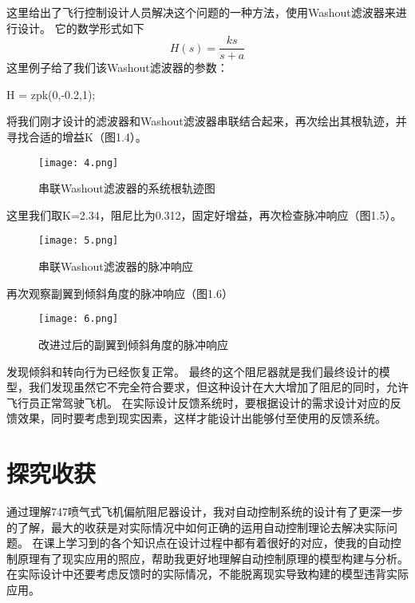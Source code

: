 \documentclass[AutoFakeBold]{LZUThesis}
\begin{document}
这里给出了飞行控制设计人员解决这个问题的一种方法，使用Washout滤波器来进行设计。
它的数学形式如下
\begin{equation}
H(s)=\frac{ks}{s+a}
\end{equation}
这里例子给了我们该Washout滤波器的参数：

    H = zpk(0,-0.2,1);

将我们刚才设计的滤波器和Washout滤波器串联结合起来，再次绘出其根轨迹，并寻找合适的增益K（图1.4）。

\begin{figure}[htbp]
    \centering
    \texttt{[image: 4.png]}
    \caption{串联Washout滤波器的系统根轨迹图}
\end{figure}

这里我们取K=2.34，阻尼比为0.312，固定好增益，再次检查脉冲响应（图1.5）。

\begin{figure}[htbp]
    \centering
    \texttt{[image: 5.png]}
    \caption{串联Washout滤波器的脉冲响应}
\end{figure}

再次观察副翼到倾斜角度的脉冲响应（图1.6）

\begin{figure}[htbp]
    \centering
    \texttt{[image: 6.png]}
    \caption{改进过后的副翼到倾斜角度的脉冲响应}
\end{figure}

发现倾斜和转向行为已经恢复正常。
最终的这个阻尼器就是我们最终设计的模型，我们发现虽然它不完全符合要求，但这种设计在大大增加了阻尼的同时，允许飞行员正常驾驶飞机。
在实际设计反馈系统时，要根据设计的需求设计对应的反馈效果，同时要考虑到现实因素，这样才能设计出能够付至使用的反馈系统。


\chapter{探究收获}
通过理解747喷气式飞机偏航阻尼器设计，我对自动控制系统的设计有了更深一步的了解，最大的收获是对实际情况中如何正确的运用自动控制理论去解决实际问题。
在课上学习到的各个知识点在设计过程中都有着很好的对应，使我的自动控制原理有了现实应用的照应，帮助我更好地理解自动控制原理的模型构建与分析。在实际设计中还要考虑反馈时的实际情况，不能脱离现实导致构建的模型违背实际应用。






\backmatter


\printbib
\nocite{*} %




\end{document}
